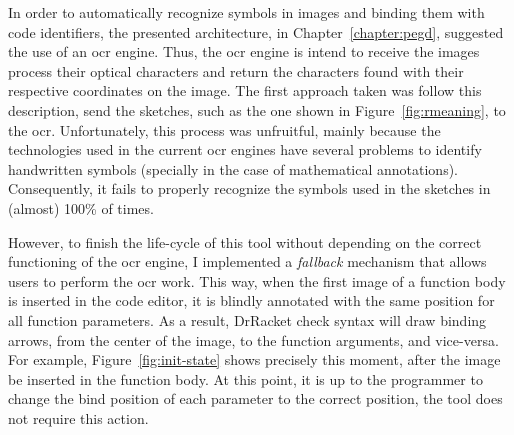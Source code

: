 \begin{figure}[h]
\begin{minipage}[t]{.495\textwidth}
  \label{fig:collapsed}
\end{minipage}
\end{figure}


In order to automatically recognize symbols in images and binding them with code identifiers, the presented architecture, in Chapter~\ref{chapter:pegd}, suggested the use of an \gls{ocr} engine. Thus, the \gls{ocr} engine is intend to receive the images process their optical characters and return the characters found with their respective coordinates on the image. The first approach taken was follow this description, send the sketches, such as the one shown in Figure~\ref{fig:rmeaning}, to the \gls{ocr}. Unfortunately, this process was unfruitful, mainly because the technologies used in the current \gls{ocr} engines have several problems to identify  handwritten symbols (specially in the case of mathematical annotations). Consequently, it fails to properly recognize the symbols used in the sketches in (almost) 100\% of times.

However, to finish the life-cycle of this tool without depending on the correct functioning of the \gls{ocr} engine, I implemented a \textit{fallback} mechanism that allows users to perform the \gls{ocr} work. This way, when the first image of a function body is inserted in the code editor, it is blindly annotated with the same position for all function parameters. As a result, DrRacket check syntax will draw binding arrows, from the center of the image, to the function arguments, and vice-versa. For example, Figure~\ref{fig:init-state} shows precisely this moment, after the image be inserted in the function body. At this point, it is up to the programmer to change the bind position of each parameter to the correct position, the tool does not require this action. 

